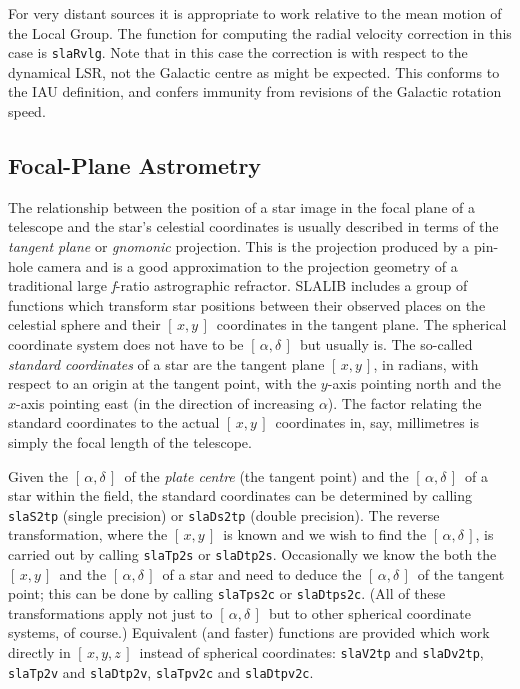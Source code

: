 \documentclass[11pt,fleqn,twoside]{article}
\renewcommand{\_}{{\tt\char'137}}     %
\newcommand{\radec}     {$[\,\alpha,\delta\,]$}
\newcommand{\xy}        {$[\,x,y\,]$}
\newcommand{\xyz}       {$[\,x,y,z\,]$}
\begin{document}
For very distant sources it is appropriate to work relative
to the mean motion of the Local Group.  The function for
computing the radial velocity correction in this case is
{\tt slaRvlg}.
Note that in this case the correction is with respect to the
dynamical LSR, not the Galactic centre as might be expected.
This conforms to the IAU definition, and confers immunity from
revisions of the Galactic rotation speed.

\subsection{Focal-Plane Astrometry}
The relationship between the position of a star image in
the focal plane of a telescope and the star's celestial
coordinates is usually described in terms of the {\it tangent plane}\/
or {\it gnomonic}\/ projection.  This is the projection produced
by a pin-hole camera and is a good approximation to the projection
geometry of a traditional large {\it f}\/-ratio astrographic refractor.
SLALIB includes a group of functions which transform
star positions between their observed places on the celestial
sphere and their \xy\ coordinates in the tangent plane.  The
spherical coordinate system does not have to be \radec\ but
usually is.  The so-called {\it standard coordinates}\/ of a star
are the tangent plane \xy, in radians, with respect to an origin
at the tangent point, with the $y$-axis pointing north and
the $x$-axis pointing east (in the direction of increasing $\alpha$).
The factor relating the standard coordinates to
the actual \xy\ coordinates in, say, millimetres is simply
the focal length of the telescope.
 
Given the \radec\ of the {\it plate centre}\/ (the tangent point)
and the \radec\ of a star within the field, the standard
coordinates can be determined by calling
{\tt slaS2tp}
(single precision) or
{\tt slaDs2tp}
(double precision).  The reverse transformation, where the
\xy\ is known and we wish to find the \radec, is carried out by calling
{\tt slaTp2s}
or
{\tt slaDtp2s}.
Occasionally we know the both the \xy\ and the \radec\ of a
star and need to deduce the \radec\ of the tangent point;
this can be done by calling
{\tt slaTps2c}
or
{\tt slaDtps2c}.
(All of these transformations apply not just to \radec\ but to
other spherical coordinate systems, of course.)
Equivalent (and faster)
functions are provided which work directly in \xyz\ instead of
spherical coordinates:
{\tt slaV2tp} and
{\tt slaDv2tp},
{\tt slaTp2v} and
{\tt slaDtp2v},
{\tt slaTpv2c} and
{\tt slaDtpv2c}.
 
\end{document}
